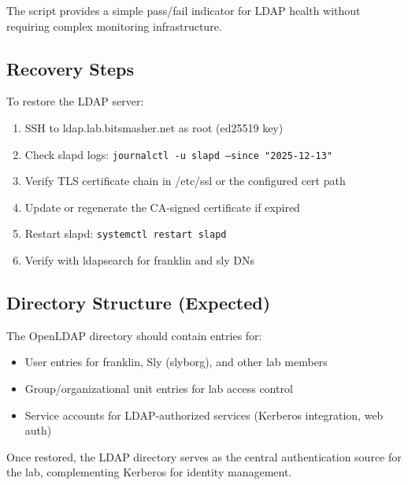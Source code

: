 The script provides a simple pass/fail indicator for LDAP health without requiring complex monitoring infrastructure.

\subsection{Recovery Steps}

To restore the LDAP server:
\begin{enumerate}
    \item SSH to ldap.lab.bitsmasher.net as root (ed25519 key)
    
    \item Check slapd logs: \texttt{journalctl -u slapd --since "2025-12-13"}
    
    \item Verify TLS certificate chain in /etc/ssl or the configured cert path
    
    \item Update or regenerate the CA-signed certificate if expired
    
    \item Restart slapd: \texttt{systemctl restart slapd}
    
    \item Verify with ldapsearch for franklin and sly DNs
\end{enumerate}

\subsection{Directory Structure (Expected)}

The OpenLDAP directory should contain entries for:
\begin{itemize}
    \item User entries for franklin, Sly (slyborg), and other lab members
    
    \item Group/organizational unit entries for lab access control
    
    \item Service accounts for LDAP-authorized services (Kerberos integration, web auth)
\end{itemize}

Once restored, the LDAP directory serves as the central authentication source for the lab, complementing Kerberos for identity management.
